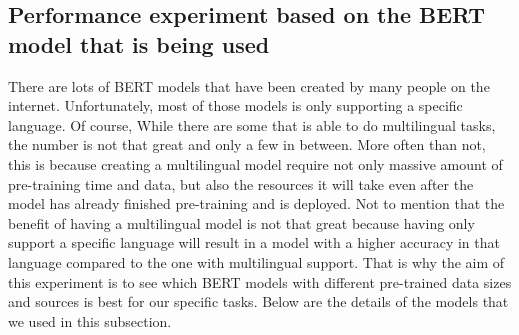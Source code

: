 \subsection{Performance experiment based on the BERT model that is being used}

There are lots of BERT models that have been created by many people on the internet. Unfortunately, most of those models is only supporting a specific language. Of course, While there are some that is able to do multilingual tasks, the number is not that great and only a few in between. More often than not, this is because creating a multilingual model require not only massive amount of pre-training time and data, but also the resources it will take even after the model has already finished pre-training and is deployed. Not to mention that the benefit of having a multilingual model is not that great because having only support a specific language will result in a model with a higher accuracy in that language compared to the one with multilingual support. That is why the aim of this experiment is to see which BERT models with different pre-trained data sizes and sources is best for our specific tasks. Below are the details of the models that we used in this subsection.

